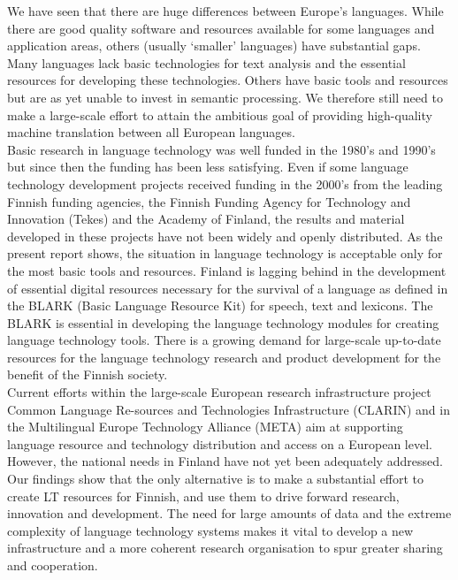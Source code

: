 \begin{multicols}{2}
We have seen that there are huge differences between Europe’s
languages. While there are good quality software and resources
available for some languages and application areas, others (usually
‘smaller’ languages) have substantial gaps.  Many languages lack basic
technologies for text analysis and the essential resources for
developing these technologies. Others have basic tools and resources
but are as yet unable to invest in semantic processing. We therefore
still need to make a large-scale effort to attain the ambitious goal
of providing high-quality machine translation between all European
languages.\\
Basic research in language technology was well funded in the 1980's
and 1990's but since then the funding has been less satisfying. Even
if some language technology development projects received funding in
the 2000's from the leading Finnish funding agencies, the Finnish
Funding Agency for Technology and Innovation (Tekes) and the Academy
of Finland, the results and material developed in these projects have
not been widely and openly distributed. As the present report shows,
the situation in language technology is acceptable only for the most
basic tools and resources. Finland is lagging behind in the
development of essential digital resources necessary for the survival
of a language as defined in the BLARK (Basic Language Resource Kit)
for speech, text and lexicons. The BLARK is essential in developing
the language technology modules for creating language technology
tools. There is a growing demand for large-scale up-to-date resources
for the language technology research and product development for the
benefit of the Finnish society.\\
Current efforts within the large-scale European research
infrastructure project Common Language Re-sources and Technologies
Infrastructure (CLARIN) and in the Multilingual Europe Technology
Alliance (META) aim at supporting language resource and technology
distribution and access on a European level. However, the national
needs in Finland have not yet been adequately addressed.\\
Our findings show that the only alternative is to make a substantial
effort to create LT resources for Finnish, and use them to drive
forward research, innovation and development. The need for large
amounts of data and the extreme complexity of language technology
systems makes it vital to develop a new infrastructure and a more
coherent research organisation to spur greater sharing and
cooperation.\\

\end{multicols}

